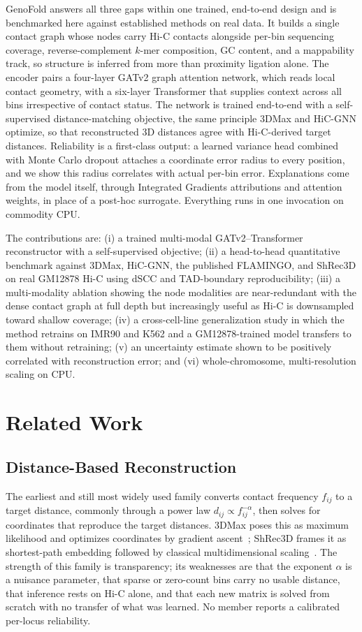 \documentclass[conference]{IEEEtran}
\begin{document}
GenoFold answers all three gaps within one trained, end-to-end design and is
benchmarked here against established methods on real data. It builds a single contact
graph whose nodes carry Hi-C contacts alongside per-bin sequencing coverage,
reverse-complement $k$-mer composition, GC content, and a mappability track, so structure
is inferred from more than proximity ligation alone. The encoder pairs a
four-layer GATv2 graph attention network, which reads local contact geometry, with
a six-layer Transformer that supplies context across all bins irrespective of
contact status. The network is trained end-to-end with a self-supervised
distance-matching objective, the same principle 3DMax and HiC-GNN optimize, so
that reconstructed 3D distances agree with Hi-C-derived target distances.
Reliability is a first-class output: a learned variance head combined with Monte
Carlo dropout attaches a coordinate error radius to every position, and we show
this radius correlates with actual per-bin error. Explanations come from the
model itself, through Integrated Gradients attributions and attention weights, in
place of a post-hoc surrogate. Everything runs in one invocation on commodity CPU.

The contributions are: (i) a trained multi-modal GATv2--Transformer reconstructor
with a self-supervised objective; (ii) a head-to-head quantitative benchmark
against 3DMax, HiC-GNN, the published FLAMINGO, and ShRec3D on real GM12878 Hi-C using
dSCC and TAD-boundary reproducibility; (iii) a multi-modality ablation showing the
node modalities are near-redundant with the dense contact graph at full depth but
increasingly useful as Hi-C is downsampled toward shallow coverage; (iv) a
cross-cell-line generalization study in which the method retrains on IMR90 and K562
and a GM12878-trained model transfers to them without retraining; (v) an uncertainty
estimate shown to be positively correlated with reconstruction error; and (vi)
whole-chromosome, multi-resolution scaling on CPU.

\section{Related Work}
\subsection{Distance-Based Reconstruction}
The earliest and still most widely used family converts contact frequency $f_{ij}$
to a target distance, commonly through a power law $d_{ij} \propto f_{ij}^{-\alpha}$,
then solves for coordinates that reproduce the target distances. 3DMax poses this
as maximum likelihood and optimizes coordinates by gradient
ascent~\cite{oluwadare2018}; ShRec3D frames it as shortest-path embedding followed
by classical multidimensional scaling~\cite{lesne2014}. The strength of this
family is transparency; its weaknesses are that the exponent $\alpha$ is a nuisance
parameter, that sparse or zero-count bins carry no usable distance, that inference
rests on Hi-C alone, and that each new matrix is solved from scratch with no
transfer of what was learned. No member reports a calibrated per-locus reliability.
\end{document}
